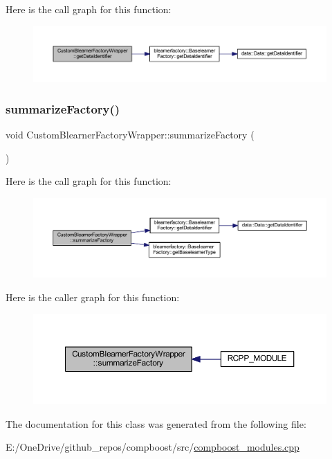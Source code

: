 Here is the call graph for this function\+:\nopagebreak
\begin{figure}[H]
\begin{center}
\leavevmode
\includegraphics[width=350pt]{class_custom_blearner_factory_wrapper_a67eba4cecf4cbde07ce5dca73a909f0f_cgraph}
\end{center}
\end{figure}
\mbox{\label{class_custom_blearner_factory_wrapper_a5247b68ba5b66b7ad70fc408b0c9da2c}} 
\subsubsection{\texorpdfstring{summarize\+Factory()}{summarizeFactory()}}
{\footnotesize\ttfamily void Custom\+Blearner\+Factory\+Wrapper\+::summarize\+Factory (\begin{DoxyParamCaption}{ }\end{DoxyParamCaption})\hspace{0.3cm}{\ttfamily [inline]}}

Here is the call graph for this function\+:\nopagebreak
\begin{figure}[H]
\begin{center}
\leavevmode
\includegraphics[width=350pt]{class_custom_blearner_factory_wrapper_a5247b68ba5b66b7ad70fc408b0c9da2c_cgraph}
\end{center}
\end{figure}
Here is the caller graph for this function\+:\nopagebreak
\begin{figure}[H]
\begin{center}
\leavevmode
\includegraphics[width=350pt]{class_custom_blearner_factory_wrapper_a5247b68ba5b66b7ad70fc408b0c9da2c_icgraph}
\end{center}
\end{figure}


The documentation for this class was generated from the following file\+:\begin{DoxyCompactItemize}
\item 
E\+:/\+One\+Drive/github\+\_\+repos/compboost/src/\mbox{\hyperlink{compboost__modules_8cpp}{compboost\+\_\+modules.\+cpp}}\end{DoxyCompactItemize}
